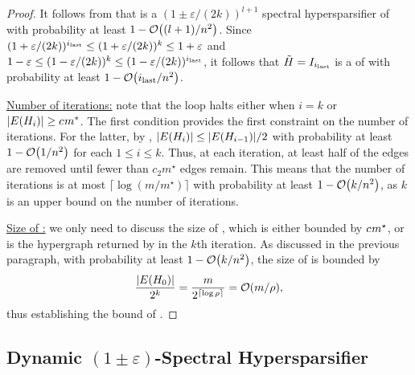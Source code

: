 \begin{proof}
It follows from  that  is a \( (1 \pm \varepsilon /(2k) )^{l+1} \) spectral hypersparsifier of 
with probability at least \( 1 - \atmost{(l + 1)/n^2} \).
Since \( ( 1 + \varepsilon / (2k) )^{{i_{\text{last} }}} \leq ( 1 + \varepsilon / (2k) )^{k} \leq  1 + \varepsilon \) and \( 1 - \varepsilon \leq ( 1 - \varepsilon / (2k) )^{k} \leq ( 1 - \varepsilon / (2k) )^{{i_{\text{last} }}} \), it follows that \( { \tilde H} = { I_{i_{\text{last} }}} \) is a \SpectralHypersparsifier{} of  with probability at least \( 1 - \atmost{\ilast / n^2} \).

\underline{Number of iterations:}
note that the loop halts either when \( i = k \) or \( |E({ H_i})| \geq c_{ } m^*  \).
The first condition provides the first constraint on the number of iterations.
For the latter, by , \( |E({ H_i})| \leq |E({ H_{i - 1}})| /2 \) with probability at least \( 1 - \atmost{1/n^2} \) for each \( 1 \leq i \leq k \).
Thus, at each iteration, at least half of the edges are removed until fewer than \( c_2 m ^\star \) edges remain. This means that the number of iterations is at most \( \lceil \log \left( m / m^\star \right) \rceil \) with probability at least \( 1 - \atmost{k/n^2} \), as \( k \) is an upper bound on the number of iterations.

\underline{Size of :}
we only need to discuss the size of , which is either bounded by \( c_{ } m^\star \), or is the hypergraph  returned by  in the \( k \)th iteration.
As discussed in the previous paragraph, with probability at least \( 1 - \atmost{k/n^2} \), the size of  is bounded by 
\begin{equation*}
\frac{|E(\hypergraph{H_0})|}{2^k} = \frac{m}{2^{\lceil \log \rho \rceil}} = \atmost{m / \rho},
\end{equation*}
thus establishing the bound of .
\end{proof}






\subsection{Dynamic \( (1 \pm \varepsilon) \)-Spectral Hypersparsifier} \label{subsec:dynamic}




